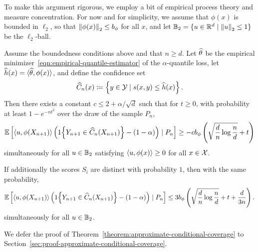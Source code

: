 \documentclass[11pt]{article}
\newcommand{\radphi}{b_{\phi}}
\newcommand{\scorefunc}{s}
\newcommand{\scoreval}{\scorefunc}
\newcommand{\scorerv}{S}
\begin{document}
To make this argument rigorous, we employ a bit of empirical
process theory and measure concentration.
%
For now and for simplicity, we assume that $\phi(x)$ is bounded in
$\ell_2$, so that $\ltwo{\phi(x)} \le \radphi$ for all $x$,
and let $\mathbb{B}_2 = \{u \in \mathbb{R}^d \mid \left\|{u}\right\|_2 \le 1\}$ be the
$\ell_2$-ball.

\begin{theorem}
  \label{theorem:approximate-conditional-coverage}
  Assume the boundedness conditions above and that $n \ge d$.
  Let $\widehat{\theta}$ be the empirical
  minimizer~\eqref{eqn:empirical-quantile-estimator} of the
  $\alpha$-quantile loss, let $\widehat{h}(x) = \langle\widehat{\theta}, \phi(x)\rangle$,
  and define the confidence set
  \begin{equation*}
    \what{C}_n(x) \defeq \left\{y \in \mc{Y}
    \mid \scoreval(x, y) \le \what{h}(x) \right\}.
  \end{equation*}
  Then there exists a constant
  $c \le 2 + \alpha/\sqrt{d}$ such that for $t \ge 0$,
  with probability at least $1 - e^{-n t^2}$ over the draw
  of the sample $P_n$,
  \begin{equation*}
    \E\left[\<u, \phi(X_{n + 1})\>
      \left(\indic{Y_{n + 1} \in \what{C}_n(X_{n+1})}
      - (1 - \alpha)\right) \mid P_n \right]
    \ge -c \radphi \left(\sqrt{\frac{d}{n}  \log \frac{n}{d}}
    + t \right)
  \end{equation*}
  simultaneously for all $u \in \mathbb{B}_2$
  satisfying $\langle u, \phi(x)\rangle \ge 0$ for all $x \in \mathcal{X}$.
  
  If additionally the scores $\scorerv_i$ are distinct with probability $1$,
  then with the same probability,
  \begin{equation*}
    \E\left[\<u, \phi(X_{n + 1})\>
      \left(\indic{Y_{n + 1} \in \what{C}_n(X_{n+1})}
      - (1 - \alpha)\right) \mid P_n \right]
    \le 3 \radphi \left(\sqrt{\frac{d}{n} \log \frac{n}{d}}
    + t + \frac{d}{3n} \right).
  \end{equation*}
  simultaneously for all $u \in \mathbb{B}_2$.
\end{theorem}
\noindent
We defer the proof of Theorem~\ref{theorem:approximate-conditional-coverage}
to Section~\ref{sec:proof-approximate-conditional-coverage}.
\end{document}
